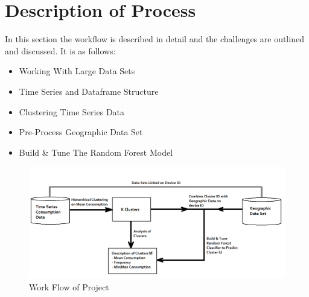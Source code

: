 \section{Description of Process}
    In this section the workflow is described in detail and the challenges are outlined and discussed. It is as follows:
    \begin{itemize}
        \item Working With Large Data Sets
        \item Time Series and Dataframe Structure
        \item Clustering Time Series Data
        \item Pre-Process Geographic Data Set
        \item Build \& Tune The Random Forest Model
    \end{itemize}
    
\begin{figure}[H]
\centering     
\includegraphics[width=1\textwidth]{Figures/workflow.png}
\caption{Work Flow of Project}
\label{fig:Dendrogram}
\end{figure} 
    
